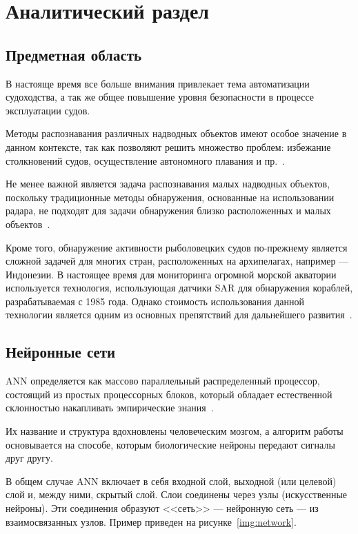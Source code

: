 \chapter{Аналитический раздел}

\section{Предметная область}

В настояще время все больше внимания привлекает тема автоматизации судоходства, а так же общее повышение уровня безопасности в процессе эксплуатации судов.

Методы распознавания различных надводных объектов имеют особое значение в данном контексте, так как позволяют решить множество проблем: избежание столкновений судов, осуществление автономного плавания и пр.~\cite{ship-detection}.

Не менее важной является задача распознавания малых надводных объектов, поскольку традиционные методы обнаружения, основанные на использовании радара, не подходят для задачи обнаружения близко расположенных и малых объектов~\cite{small-ship-detection}.

Кроме того, обнаружение активности рыболовецких судов по-прежнему является сложной задачей для многих стран, расположенных на архипелагах, например --- Индонезии. В настоящее время для мониторинга огромной морской акватории используется технология, использующая датчики SAR для обнаружения кораблей, разрабатываемая с 1985 года. Однако стоимость использования данной технологии является одним из основных препятствий для дальнейшего развития~\cite{boats-recognition}.

\section{Нейронные сети}

ANN определяется как массово параллельный распределенный процессор, состоящий из простых процессорных блоков, который обладает естественной склонностью накапливать эмпирические знания~\cite{ann}. 

Их название и структура вдохновлены человеческим мозгом, а алгоритм работы основывается на способе, которым биологические нейроны передают сигналы друг другу.

В общем случае ANN включает в себя входной слой, выходной (или целевой) слой и, между ними, скрытый слой. Слои соединены через узлы (искусственные нейроны). Эти соединения образуют <<сеть>> --- нейронную сеть --- из взаимосвязанных узлов. Пример приведен на рисунке~\ref{img:network}.

